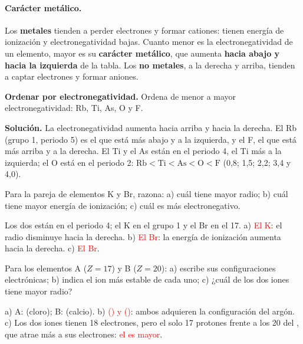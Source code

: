 \paragraph{Carácter metálico.} Los \textbf{metales} tienden a perder electrones y formar cationes: tienen energía de ionización
y electronegatividad bajas. Cuanto menor es la electronegatividad de un elemento, mayor es su \textbf{carácter metálico}, que
aumenta \textbf{hacia abajo y hacia la izquierda} de la tabla. Los \textbf{no metales}, a la derecha y arriba, tienden a captar
electrones y formar aniones.

\begin{example}
    \textbf{Ordenar por electronegatividad.} Ordena de menor a mayor electronegatividad: Rb, Ti, As, O y F.

    \textbf{Solución.} La electronegatividad aumenta hacia arriba y hacia la derecha. El Rb (grupo 1, periodo 5) es el que está
    más abajo y a la izquierda, y el F, el que está más arriba y a la derecha. El Ti y el As están en el periodo 4, el Ti más a
    la izquierda; el O está en el periodo 2:
    \(\mathrm{Rb} < \mathrm{Ti} < \mathrm{As} < \mathrm{O} < \mathrm{F}\) (0,8; 1,5; 2,2; 3,4 y 4,0).
\end{example}

\begin{exercise}
    Para la pareja de elementos K y Br, razona: a) cuál tiene mayor radio; b) cuál tiene mayor energía de ionización; c) cuál es
    más electronegativo.
    \begin{solu}
        Los dos están en el periodo 4; el K en el grupo 1 y el Br en el 17. a) \textcolor{red}{El K}: el radio disminuye hacia la
        derecha. b) \textcolor{red}{El Br}: la energía de ionización aumenta hacia la derecha. c) \textcolor{red}{El Br}.
    \end{solu}
\end{exercise}

\begin{exercise}
    Para los elementos A (\(Z = 17\)) y B (\(Z = 20\)): a) escribe sus configuraciones electrónicas; b) indica el ion más estable de
    cada uno; c) ¿cuál de los dos iones tiene mayor radio?
    \begin{solu}
        a) A:  (cloro); B:  (calcio).
        b) \textcolor{red}{ () y  ()}: ambos adquieren la configuración del argón.
        c) Los dos iones tienen 18 electrones, pero el  solo 17 protones frente a los 20 del , que atrae más
        a sus electrones: \textcolor{red}{el  es mayor}.
    \end{solu}
\end{exercise}

